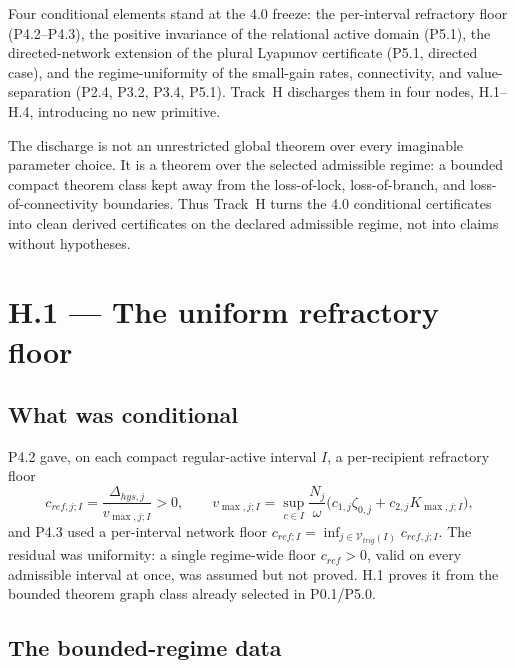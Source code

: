 \documentclass[11pt,a4paper]{article}
\newcommand{\cint}{\ensuremath{\mathfrak c}}
\def\mathfrak#1{#1}%
\def\mathrm#1{#1}%
\def\emph#1{#1}%
\theoremstyle{definition}
\theoremstyle{plain}
\theoremstyle{remark}
\begin{document}
Four conditional elements stand at the 4.0 freeze: the per-interval refractory floor
(P4.2--P4.3), the positive invariance of the relational active domain (P5.1), the
directed-network extension of the plural Lyapunov certificate (P5.1, directed case), and the
regime-uniformity of the small-gain rates, connectivity, and value-separation (P2.4, P3.2,
P3.4, P5.1). Track~H discharges them in four nodes, H.1--H.4, introducing no new primitive.

The discharge is not an unrestricted global theorem over every imaginable parameter choice. It
is a theorem over the selected admissible regime: a bounded compact theorem class kept away
from the loss-of-lock, loss-of-branch, and loss-of-connectivity boundaries. Thus Track~H turns
the 4.0 conditional certificates into clean derived certificates on the declared admissible
regime, not into claims without hypotheses.

\section{H.1 --- The uniform refractory floor}

\subsection{What was conditional}

P4.2 gave, on each compact regular-active interval \(I\), a per-recipient refractory floor
\[
\mathfrak c_{\mathrm{ref},j;I}
=
\frac{\Delta_{\mathrm{hys},j}}{v_{\max,j;I}}>0,
\qquad
v_{\max,j;I}
=
\sup_{\cint\in I}\frac{N_j}{\omega}\bigl(c_{1,j}\zeta_{0,j}+c_{2,j}K_{\max,j;I}\bigr),
\]
and P4.3 used a per-interval network floor
\(\mathfrak c_{\mathrm{ref};I}=\inf_{j\in\mathcal V_{\mathrm{trig}}(I)}\mathfrak c_{\mathrm{ref},j;I}\).
The residual was uniformity: a \emph{single} regime-wide floor
\(\mathfrak c_{\mathrm{ref}}>0\), valid on every admissible interval at once, was assumed but
not proved. H.1 proves it from the bounded theorem graph class already selected in
P0.1/P5.0.

\subsection{The bounded-regime data}
\end{document}
